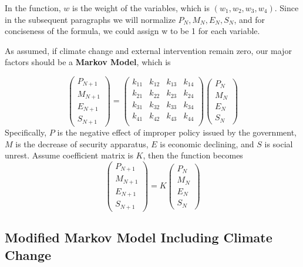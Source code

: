\documentclass{mcmthesis}
\begin{document}
	In the function, $w$ is the weight of the variables, which is $(w_1, w_2, w_3, w_4)$. Since in the subsequent paragraphs we will normalize $P_N, M_N, E_N, S_N$, and for conciseness of the formula, we could assign w to be 1 for each variable.
	
	As assumed, if climate change and external intervention remain zero, our major factors should be a \textbf{Markov Model}, which is
	
	$$
	\left(
	\begin{matrix}
	P_{N+1} \\ M_{N+1} \\ E_{N+1} \\ S_{N+1}
	\end{matrix}
	\right) 
	= 
	\left(
	\begin{matrix}
	k_{11} & k_{12} & k_{13} & k_{14} \\
	k_{21} & k_{22} & k_{23} & k_{24} \\
	k_{31} & k_{32} & k_{33} & k_{34} \\
	k_{41} & k_{42} & k_{43} & k_{44} \\
	\end{matrix}
	\right) 
	\left(
	\begin{matrix}
	P_N \\ M_N \\ E_N \\ S_N
	\end{matrix}
	\right) 
	$$
	Specifically, $P$ is the negative effect of improper policy issued by the government, $M$ is the decrease of security apparatus, $E$ is economic declining, and $S$ is social unrest. Assume coefficient matrix is $K$, then the function becomes
	$$
	\left(
	\begin{matrix}
	P_{N+1} \\ M_{N+1} \\ E_{N+1} \\ S_{N+1}
	\end{matrix}
	\right) 
	= 
	K
	\left(
	\begin{matrix}
	P_N \\ M_N \\ E_N \\ S_N
	\end{matrix}
	\right) 
	$$
	
	\subsection{Modified Markov Model Including Climate Change}
	
\end{document}
